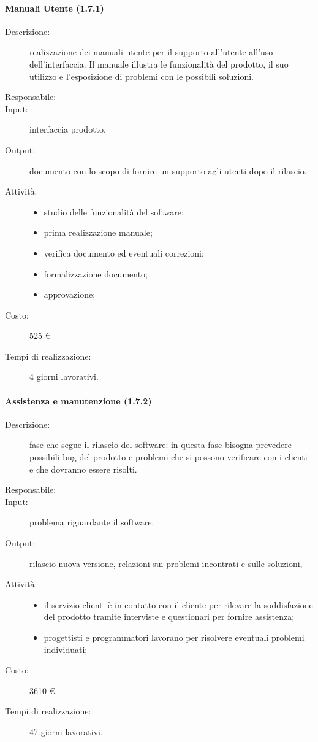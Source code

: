 \paragraph{Manuali Utente (1.7.1)}
\begin{description}
\item[Descrizione:] realizzazione dei manuali utente per il supporto all'utente all'uso dell'interfaccia. Il manuale illustra le funzionalità del prodotto, il suo utilizzo e l'esposizione di problemi con le possibili soluzioni.
\item[Responsabile:] 
\item[Input:] interfaccia prodotto.
\item[Output:] documento con lo scopo di fornire un supporto agli utenti dopo il rilascio.
\item[Attività:] 
\begin{center}
\begin{itemize}
\item studio delle funzionalità del software;
\item prima realizzazione manuale;
\item verifica documento ed eventuali correzioni;
\item formalizzazione documento;
\item approvazione;
\end{itemize}
\end{center}
\item[Costo:] 525 \euro{}
\item[Tempi di realizzazione:] 4 giorni lavorativi.
\end{description}

\paragraph{Assistenza e manutenzione (1.7.2)}
\begin{description}
\item[Descrizione:] fase che segue il rilascio del software: in questa fase bisogna prevedere
possibili bug del prodotto e problemi che si possono verificare con i clienti e che dovranno essere risolti.
\item[Responsabile:] 
\item[Input:] problema riguardante il software.
\item[Output:] rilascio nuova versione, relazioni sui problemi incontrati e sulle soluzioni,
\item[Attività:] 
\begin{center}
\begin{itemize}
\item il servizio clienti è in contatto con il cliente per rilevare la
soddisfazione del prodotto tramite interviste e questionari per fornire assistenza;
\item progettisti e programmatori lavorano per risolvere eventuali problemi individuati;
\end{itemize}
\end{center}
\item[Costo:] 3610 \euro{}.
\item[Tempi di realizzazione:] 47 giorni lavorativi.
\end{description}

